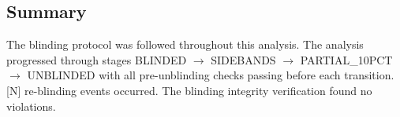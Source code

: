 \subsection{Summary}
\label{sec:blinding:summary}


The blinding protocol was followed throughout this analysis. The analysis
progressed through stages BLINDED $\to$ SIDEBANDS $\to$ PARTIAL\_10PCT
$\to$ UNBLINDED with all pre-unblinding checks passing before each
transition. [N] re-blinding events occurred. The blinding integrity
verification found no violations.
